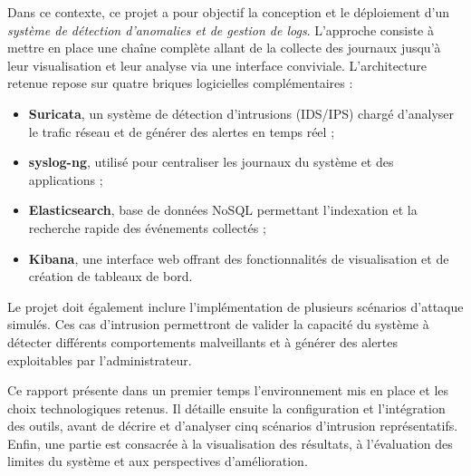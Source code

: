 \begin{introduction}

Dans ce contexte, ce projet a pour objectif la conception et le déploiement d’un
\textit{système de détection d’anomalies et de gestion de logs}. 
L’approche consiste à mettre en place une chaîne complète allant de la collecte des journaux
jusqu’à leur visualisation et leur analyse via une interface conviviale. 
L’architecture retenue repose sur quatre briques logicielles complémentaires :
\begin{itemize}
    \item \textbf{Suricata}, un système de détection d’intrusions (IDS/IPS) chargé
    d’analyser le trafic réseau et de générer des alertes en temps réel ;
    \item \textbf{syslog-ng}, utilisé pour centraliser les journaux du système et des applications ;
    \item \textbf{Elasticsearch}, base de données NoSQL permettant l’indexation et la recherche rapide
    des événements collectés ;
    \item \textbf{Kibana}, une interface web offrant des fonctionnalités de visualisation et de
    création de tableaux de bord.
\end{itemize}

Le projet doit également inclure l’implémentation de plusieurs scénarios d’attaque
simulés. Ces cas d’intrusion permettront de valider la capacité du système à détecter
différents comportements malveillants et à générer des alertes exploitables par
l’administrateur.

Ce rapport présente dans un premier temps l’environnement mis en place et les choix
technologiques retenus. Il détaille ensuite la configuration et l’intégration des outils,
avant de décrire et d’analyser cinq scénarios d’intrusion représentatifs. 
Enfin, une partie est consacrée à la visualisation des résultats, à l’évaluation des limites
du système et aux perspectives d’amélioration.

\end{introduction}
